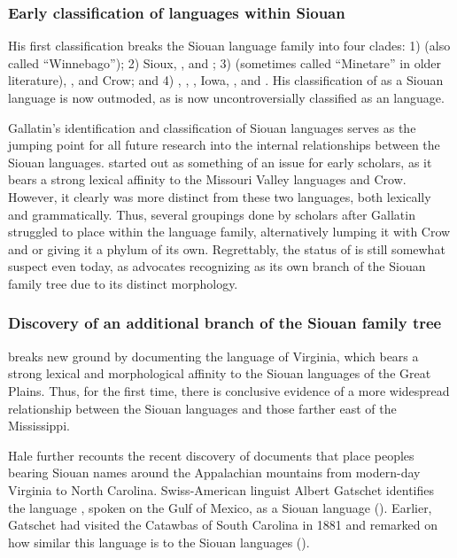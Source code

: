 \documentclass[output=paper]{LSP/langsci}
\begin{document}
\subsubsection{Early classification of languages within Siouan}

His first classification breaks the Siouan language family into four clades: 1)  (also called ``Winnebago''); 2) Sioux, , and ; 3)  (sometimes called ``Minetare'' in older literature), , and Crow; and 4) , , , Iowa, , and  \citep{ParksRankin2001}. His classification of  as a Siouan language is now outmoded, as  is now uncontroversially classified as an  language.

Gallatin's \citeyear{Gallatin1836} identification and classification of Siouan languages serves as the jumping point for all future research into the internal relationships between the Siouan languages.  started out as something of an issue for early scholars, as it bears a strong lexical affinity to the Missouri Valley languages  and Crow. However, it clearly was more distinct from these two languages, both lexically and grammatically. Thus, several groupings done by scholars after Gallatin struggled to place  within the language family, alternatively lumping it with Crow and  or giving it a phylum of its own. Regrettably, the status of  is still somewhat suspect even today, as \citet{Rankin2010} advocates recognizing  as its own branch of the Siouan family tree due to its distinct morphology.

\subsubsection{Discovery of an additional branch of the Siouan family tree} \citet{Hale1883} breaks new ground by documenting the  language of Virginia, which bears a strong lexical and morphological affinity to the Siouan languages of the Great Plains. Thus, for the first time, there is conclusive evidence of a more widespread relationship between the Siouan languages and those farther east of the Mississippi. 

Hale further recounts the recent discovery of documents that place peoples bearing Siouan names around the Appalachian mountains from modern-day Virginia to North Carolina. Swiss-American linguist Albert Gatschet identifies the language , spoken on the Gulf of Mexico, as a Siouan language (\citealt{Dorsey1893}). Earlier, Gatschet had visited the Catawbas of South Carolina in 1881 and remarked on how similar this language is to the Siouan languages (\citealt{Gatschet1900}). 
\end{document}
